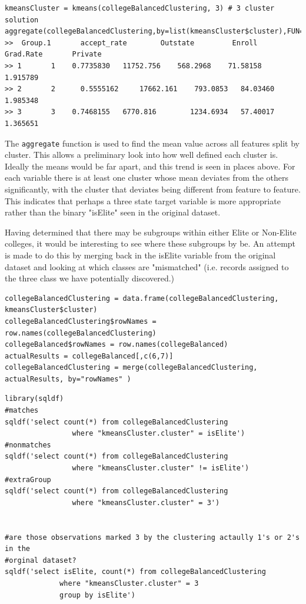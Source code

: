 \documentclass[paper=a4, fontsize=11pt]{scrartcl} %
\begin{document}
\begin{lstlisting}
kmeansCluster = kmeans(collegeBalancedClustering, 3) # 3 cluster solution
aggregate(collegeBalancedClustering,by=list(kmeansCluster$cluster),FUN=mean)
>>  Group.1		  accept_rate	 	 Outstate	  	  Enroll	 	Grad.Rate  		Private
>> 1       1   	0.7735830 	11752.756 	 568.2968 	 71.58158 	1.915789
>> 2       2 	  0.5555162 	17662.161 	 793.0853  	84.03460 		1.985348
>> 3       3   	0.7468155  	6770.816 		1234.6934  	57.40017 		1.365651
\end{lstlisting}
{\par The \texttt{aggregate} function is used to find the mean value across all features split by cluster. This allows a preliminary look into how well defined each cluster is. Ideally the means would be far apart, and this trend is seen in places above. For each variable there is at least one cluster whose mean deviates from the others significantly, with the cluster that deviates being different from feature to feature. This indicates that perhaps a three state target variable is more appropriate rather than the binary "isElite" seen in the original dataset.}
{\par Having determined that there may be subgroups within either Elite or Non-Elite colleges, it would be interesting to see where these subgroups by be. An attempt is made to do this by merging back in the isElite variable from the original dataset and looking at which classes are "mismatched" (i.e. records assigned to the three class we have potentially discovered.)}
\begin{lstlisting}
collegeBalancedClustering = data.frame(collegeBalancedClustering, kmeansCluster$cluster)
collegeBalancedClustering$rowNames = row.names(collegeBalancedClustering)
collegeBalanced$rowNames = row.names(collegeBalanced)
actualResults = collegeBalanced[,c(6,7)]
collegeBalancedClustering = merge(collegeBalancedClustering, actualResults, by="rowNames" )
\end{lstlisting}

\begin{lstlisting}
library(sqldf)
#matches 
sqldf('select count(*) from collegeBalancedClustering 
                where "kmeansCluster.cluster" = isElite')
#nonmatches
sqldf('select count(*) from collegeBalancedClustering 
                where "kmeansCluster.cluster" != isElite')
#extraGroup
sqldf('select count(*) from collegeBalancedClustering 
                where "kmeansCluster.cluster" = 3')


#are those observations marked 3 by the clustering actaully 1's or 2's in the
#orginal dataset?
sqldf('select isElite, count(*) from collegeBalancedClustering
             where "kmeansCluster.cluster" = 3 
             group by isElite')
\end{lstlisting}
\end{document}
